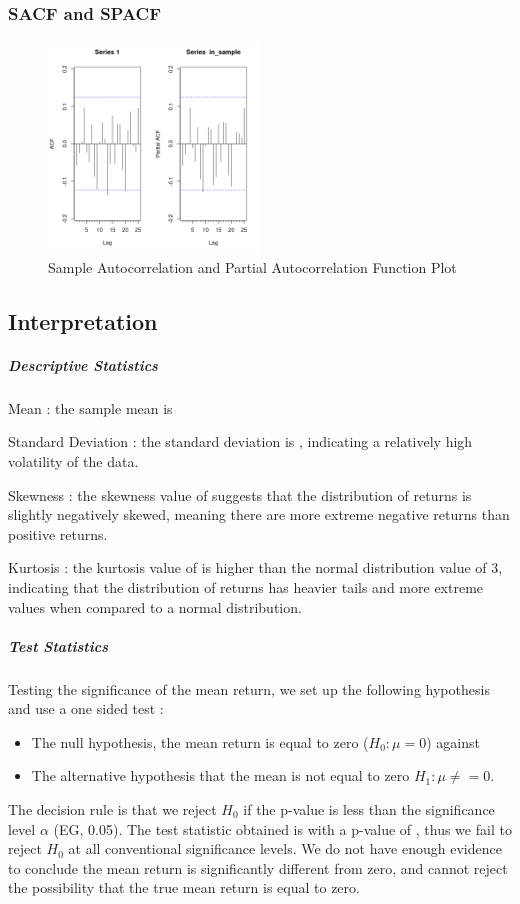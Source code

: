 \documentclass{article}
\begin{document}
\subsubsection*{SACF and SPACF}

\begin{figure}[H]
    \centering
    \includegraphics[width=0.5\textwidth]{../../docs/figures/PACF.png}
    \caption{Sample Autocorrelation and Partial Autocorrelation Function Plot}
    \label{fig:pacf}
\end{figure}

\subsection*{Interpretation}

\subparagraph{Descriptive Statistics}  

Mean : the sample mean is \amu 

Standard Deviation : the standard deviation is \asigma, indicating a relatively high volatility of the data. 

Skewness : the skewness value of \askew suggests that the distribution of returns is slightly negatively skewed, meaning there are more extreme negative returns than positive returns. 

Kurtosis : the kurtosis value of \akurt is higher than the normal distribution value of 3, indicating that the distribution of returns has heavier tails and more extreme values when compared to a normal distribution. 

\subparagraph{Test Statistics}

Testing the significance of the mean return, we set up the following hypothesis and use a one sided test :
\begin{itemize}
	\item The null hypothesis, the mean return is equal to zero ($H_0 : \mu =0$) against
	\item The alternative hypothesis that the mean is not equal to zero $H_1 : \mu \neq = 0$.
\end{itemize}
The decision rule is that we reject $H_0$ if the p-value is less than the significance level $\alpha$ (EG, 0.05). 
The test statistic obtained is \amut with a p-value of \amup, thus we fail to reject $H_0$ at all conventional significance levels. 
We do not have enough evidence to conclude the mean return is significantly different from zero, and cannot reject the possibility that the true mean return is equal to zero. 
\end{document}
